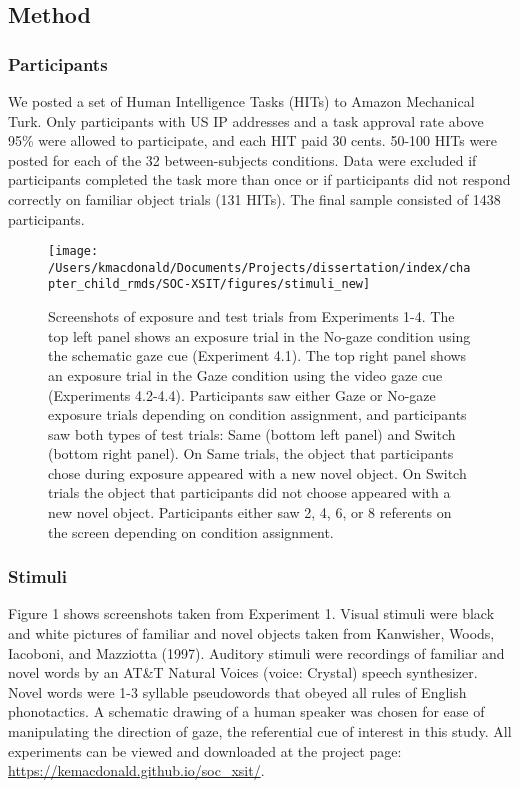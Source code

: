 \documentclass[oneside]{report}
\begin{document}
\hypertarget{method}{%
\subsection{Method}\label{method}}

\hypertarget{participants}{%
\subsubsection{Participants}\label{participants}}

We posted a set of Human Intelligence Tasks (HITs) to Amazon Mechanical
Turk. Only participants with US IP addresses and a task approval rate
above 95\% were allowed to participate, and each HIT paid 30 cents.
50-100 HITs were posted for each of the 32 between-subjects conditions.
Data were excluded if participants completed the task more than once or
if participants did not respond correctly on familiar object trials (131
HITs). The final sample consisted of 1438 participants.
\begin{figure}[t]

{\centering \texttt{[image: /Users/kmacdonald/Documents/Projects/dissertation/index/chapter\_child\_rmds/SOC-XSIT/figures/stimuli\_new]} 

}

\caption[Examples of stimuli for exposure and test trials from Experiments 4.1-4.4.]{Screenshots of exposure and test trials from Experiments 1-4. The top left panel shows an exposure trial in the No-gaze condition using the schematic gaze cue (Experiment 4.1). The top right panel shows an exposure trial in the Gaze condition using the video gaze cue (Experiments 4.2-4.4). Participants saw either Gaze or No-gaze exposure trials depending on condition assignment, and participants saw both types of test trials: Same (bottom left panel) and Switch (bottom right panel). On Same trials, the object that participants chose during exposure appeared with a new novel object. On Switch trials the object that participants did not choose appeared with a new novel object. Participants either saw 2, 4, 6, or 8 referents on the screen depending on condition assignment.}\label{fig:stimuli}
\end{figure}
\hypertarget{stimuli-1}{%
\subsubsection{Stimuli}\label{stimuli-1}}

Figure 1 shows screenshots taken from Experiment 1. Visual stimuli were
black and white pictures of familiar and novel objects taken from
Kanwisher, Woods, Iacoboni, and Mazziotta (1997). Auditory stimuli were
recordings of familiar and novel words by an AT\&T Natural Voices
\texttrademark (voice: Crystal) speech synthesizer. Novel words were 1-3
syllable pseudowords that obeyed all rules of English phonotactics. A
schematic drawing of a human speaker was chosen for ease of manipulating
the direction of gaze, the referential cue of interest in this study.
All experiments can be viewed and downloaded at the project page:
\url{https://kemacdonald.github.io/soc_xsit/}.
\end{document}
